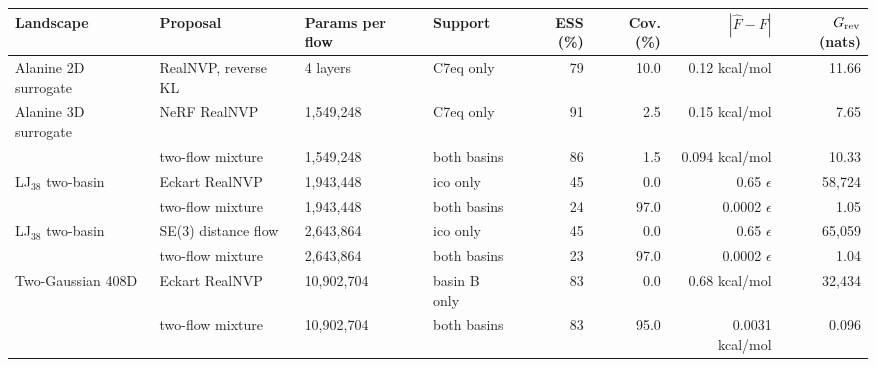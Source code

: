 \begin{tabular}{llllrrrr}
\toprule
Landscape & Proposal & Params per flow & Support & ESS (\%) & Cov. (\%) & $|\hat F-F|$ & $G_{\rm rev}$ (nats) \\
\midrule
Alanine 2D surrogate & RealNVP, reverse KL & 4 layers & C7eq only & 79 & 10.0 & 0.12 kcal/mol & 11.66 \\
\midrule
Alanine 3D surrogate & NeRF RealNVP & 1,549,248 & C7eq only & 91 & 2.5 & 0.15 kcal/mol & 7.65 \\
 & two-flow mixture & 1,549,248 & both basins & 86 & 1.5 & 0.094 kcal/mol & 10.33 \\
\midrule
LJ$_{38}$ two-basin & Eckart RealNVP & 1,943,448 & ico only & 45 & 0.0 & 0.65 $\epsilon$ & 58{,}724 \\
 & two-flow mixture & 1,943,448 & both basins & 24 & 97.0 & 0.0002 $\epsilon$ & 1.05 \\
\midrule
LJ$_{38}$ two-basin & SE(3) distance flow & 2,643,864 & ico only & 45 & 0.0 & 0.65 $\epsilon$ & 65{,}059 \\
 & two-flow mixture & 2,643,864 & both basins & 23 & 97.0 & 0.0002 $\epsilon$ & 1.04 \\
\midrule
Two-Gaussian 408D & Eckart RealNVP & 10,902,704 & basin B only & 83 & 0.0 & 0.68 kcal/mol & 32{,}434 \\
 & two-flow mixture & 10,902,704 & both basins & 83 & 95.0 & 0.0031 kcal/mol & 0.096 \\
\bottomrule
\end{tabular}
